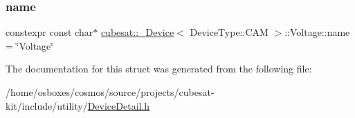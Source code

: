 \subsubsection{\texorpdfstring{name}{name}}
{\footnotesize\ttfamily constexpr const char$\ast$ \hyperlink{structcubesat_1_1__Device}{cubesat\+::\+\_\+\+Device}$<$ Device\+Type\+::\+C\+AM $>$\+::Voltage\+::name = \char`\"{}Voltage\char`\"{}\hspace{0.3cm}{\ttfamily [static]}}



The documentation for this struct was generated from the following file\+:\begin{DoxyCompactItemize}
\item 
/home/osboxes/cosmos/source/projects/cubesat-\/kit/include/utility/\hyperlink{DeviceDetail_8h}{Device\+Detail.\+h}\end{DoxyCompactItemize}
